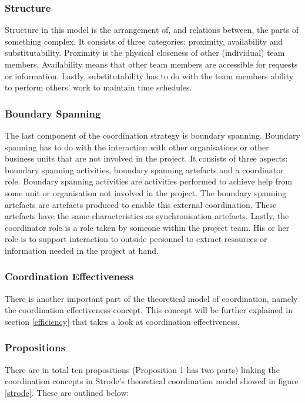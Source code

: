 \subsubsection{Structure}

Structure in this model is the arrangement of, and relations between, the parts of something complex. It consists of three categories: proximity, availability and substitutability. Proximity is the physical closeness of other (individual) team members. Availability means that other team members are accessible for requests or information. Lastly, substitutability has to do with the team members ability to perform others' work to maintain time schedules.

\subsubsection{Boundary Spanning}

The last component of the coordination strategy is boundary spanning. Boundary spanning has to do with the interaction with other organisations or other business units that are not involved in the project. It consists of three aspects: boundary spanning activities, boundary spanning artefacts and a coordinator role. Boundary spanning activities are activities performed to achieve help from some unit or organisation not involved in the project. The boundary spanning artefacts are artefacts produced to enable this external coordination. These artefacts have the same characteristics as synchronisation artefacts. Lastly, the coordinator role is a role taken by someone within the project team. His or her role is to support interaction to outside personnel to extract resources or information needed in the project at hand.

\subsubsection{Coordination Effectiveness}

There is another important part of the theoretical model of coordination, namely the coordination effectiveness concept. This concept will be further explained in section \ref{efficiency} that takes a look at coordination effectiveness.

\subsubsection{Propositions}

There are in total ten propositions (Proposition 1 has two parts) linking the coordination concepts in Strode's theoretical coordination model showed in figure \ref{strode}. These are outlined below:

